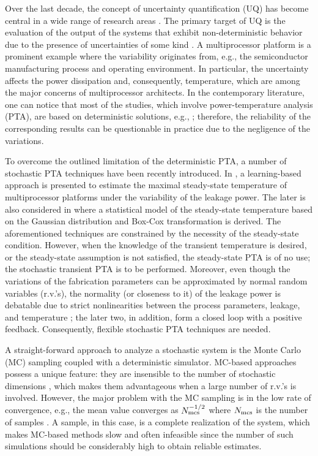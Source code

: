 Over the last decade, the concept of uncertainty quantification (UQ) has become central in a wide range of research areas \cite{xiu2009}. The primary target of UQ is the evaluation of the output of the systems that exhibit non-deterministic behavior due to the presence of uncertainties of some kind \cite{eldred2009}. A multiprocessor platform is a prominent example where the variability originates from, e.g., the semiconductor manufacturing process and operating environment. In particular, the uncertainty affects the power dissipation and, consequently, temperature, which are among the major concerns of multiprocessor architects. In the contemporary literature, one can notice that most of the studies, which involve power-temperature analysis (PTA), are based on deterministic solutions, e.g., \cite{ukhov2012}; therefore, the reliability of the corresponding results can be questionable in practice due to the negligence of the variations.

To overcome the outlined limitation of the deterministic PTA, a number of stochastic PTA techniques have been recently introduced. In \cite{juan2011}, a learning-based approach is presented to estimate the maximal steady-state temperature of multiprocessor platforms under the variability of the leakage power. The later is also considered in \cite{juan2012} where a statistical model of the steady-state temperature based on the Gaussian distribution and Box-Cox transformation is derived. The aforementioned techniques are constrained by the necessity of the steady-state condition. However, when the knowledge of the transient temperature is desired, or the steady-state assumption is not satisfied, the steady-state PTA is of no use; the stochastic transient PTA is to be performed. Moreover, even though the variations of the fabrication parameters can be approximated by normal random variables (r.v.'s), the normality (or closeness to it) of the leakage power is debatable due to strict nonlinearities between the process parameters, leakage, and temperature \cite{liu2007}; the later two, in addition, form a closed loop with a positive feedback. Consequently, flexible stochastic PTA techniques are needed.

A straight-forward approach to analyze a stochastic system is the Monte Carlo (MC) sampling coupled with a deterministic simulator. MC-based approaches possess a unique feature: they are insensible to the number of stochastic dimensions \cite{maitre2010}, which makes them advantageous when a large number of r.v.'s is involved. However, the major problem with the MC sampling is in the low rate of convergence, e.g., the mean value converges as $N_\text{mcs}^{-{{1}/{2}}}$ where $N_\text{mcs}$ is the number of samples \cite{xiu2009, maitre2010}. A sample, in this case, is a complete realization of the system, which makes MC-based methods slow and often infeasible since the number of such simulations should be considerably high to obtain reliable estimates.

